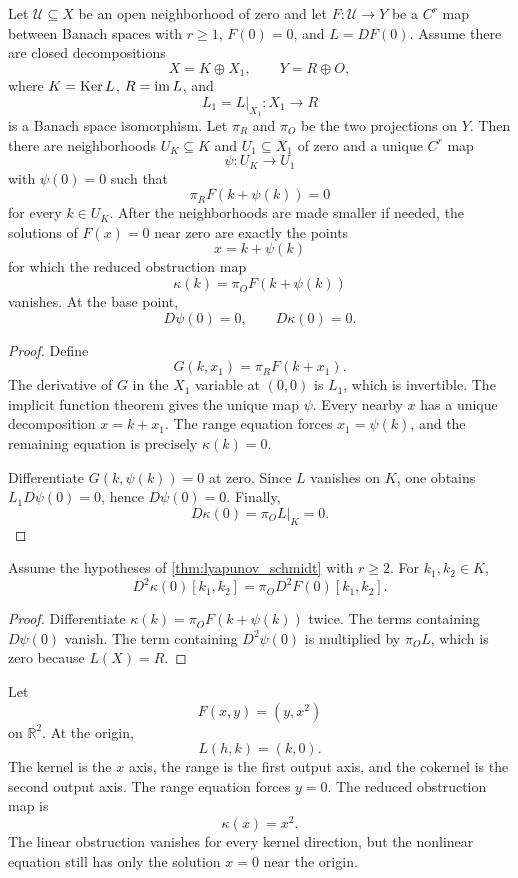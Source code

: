 \begin{theorem}\label{thm:lyapunov_schmidt}
Let $\mathcal U\subseteq X$ be an open neighborhood of zero and let $F:\mathcal U\to Y$ be a $C^r$ map between Banach spaces with $r\ge1$, $F(0)=0$, and $L=DF(0)$.  Assume there are closed decompositions
\[
X=K\oplus X_1,
\qquad
Y=R\oplus O,
\]
where $K=\operatorname{Ker} L$, $R=\operatorname{im} L$, and
\[
L_1=L|_{X_1}:X_1\longrightarrow R
\]
is a Banach space isomorphism.  Let $\pi_R$ and $\pi_O$ be the two projections on $Y$.  Then there are neighborhoods $U_K\subseteq K$ and $U_1\subseteq X_1$ of zero and a unique $C^r$ map
\[
\psi:U_K\longrightarrow U_1
\]
with $\psi(0)=0$ such that
\[
\pi_RF(k+\psi(k))=0
\]
for every $k\in U_K$.  After the neighborhoods are made smaller if needed, the solutions of $F(x)=0$ near zero are exactly the points
\[
x=k+\psi(k)
\]
for which the reduced obstruction map
\[
\kappa(k)=\pi_OF(k+\psi(k))
\]
vanishes.  At the base point,
\[
D\psi(0)=0,
\qquad
D\kappa(0)=0.
\]
\end{theorem}

\begin{proof}
Define
\[
G(k,x_1)=\pi_RF(k+x_1).
\]
The derivative of $G$ in the $X_1$ variable at $(0,0)$ is $L_1$, which is invertible.  The implicit function theorem gives the unique map $\psi$.  Every nearby $x$ has a unique decomposition $x=k+x_1$.  The range equation forces $x_1=\psi(k)$, and the remaining equation is precisely $\kappa(k)=0$.

Differentiate $G(k,\psi(k))=0$ at zero.  Since $L$ vanishes on $K$, one obtains $L_1D\psi(0)=0$, hence $D\psi(0)=0$.  Finally,
\[
D\kappa(0)=\pi_OL|_K=0.
\]
\end{proof}


\begin{corollary}\label{cor:quadratic_reduced_obstruction}
Assume the hypotheses of \cref{thm:lyapunov_schmidt} with $r\ge2$.  For $k_1,k_2\in K$,
\[
D^2\kappa(0)[k_1,k_2]
=
\pi_O D^2F(0)[k_1,k_2].
\]
\end{corollary}

\begin{proof}
Differentiate $\kappa(k)=\pi_OF(k+\psi(k))$ twice.  The terms containing $D\psi(0)$ vanish.  The term containing $D^2\psi(0)$ is multiplied by $\pi_OL$, which is zero because $L(X)=R$.
\end{proof}

\begin{example}\label{ex:pure_quadratic_obstruction}
Let
\[
F(x,y)=(y,x^2)
\]
on $\mathbb R^2$.  At the origin,
\[
L(h,k)=(k,0).
\]
The kernel is the $x$ axis, the range is the first output axis, and the cokernel is the second output axis.  The range equation forces $y=0$.  The reduced obstruction map is
\[
\kappa(x)=x^2.
\]
The linear obstruction vanishes for every kernel direction, but the nonlinear equation still has only the solution $x=0$ near the origin.
\end{example}

